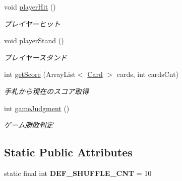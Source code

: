 \begin{DoxyCompactItemize}
void \hyperlink{classjp_1_1gr_1_1java__conf_1_1yuta__yoshinaga_1_1java__trumpcards_1_1_black_jack_a4b8f2248ac868b5d3b9506fb0ece0ea2}{player\+Hit} ()
\begin{DoxyCompactList}\small\item\em プレイヤーヒット \end{DoxyCompactList}\item 
void \hyperlink{classjp_1_1gr_1_1java__conf_1_1yuta__yoshinaga_1_1java__trumpcards_1_1_black_jack_a53f37ae6f1388143c70a8b138c6c2443}{player\+Stand} ()
\begin{DoxyCompactList}\small\item\em プレイヤースタンド \end{DoxyCompactList}\item 
int \hyperlink{classjp_1_1gr_1_1java__conf_1_1yuta__yoshinaga_1_1java__trumpcards_1_1_black_jack_a23b680e89ca3a4c306576ba0a7debfac}{get\+Score} (Array\+List$<$ \hyperlink{classjp_1_1gr_1_1java__conf_1_1yuta__yoshinaga_1_1java__trumpcards_1_1_card}{Card} $>$ cards, int cards\+Cnt)
\begin{DoxyCompactList}\small\item\em 手札から現在のスコア取得 \end{DoxyCompactList}\item 
int \hyperlink{classjp_1_1gr_1_1java__conf_1_1yuta__yoshinaga_1_1java__trumpcards_1_1_black_jack_a26f4a11e36c237ec64f08010b8ea0a01}{game\+Judgment} ()
\begin{DoxyCompactList}\small\item\em ゲーム勝敗判定 \end{DoxyCompactList}\end{DoxyCompactItemize}
\subsection*{Static Public Attributes}
\begin{DoxyCompactItemize}
\item 
\mbox{\label{classjp_1_1gr_1_1java__conf_1_1yuta__yoshinaga_1_1java__trumpcards_1_1_black_jack_a6726d858249cdc023cd6e347593b337b}} 
static final int {\bfseries D\+E\+F\+\_\+\+S\+H\+U\+F\+F\+L\+E\+\_\+\+C\+NT} = 10
\end{DoxyCompactItemize}
